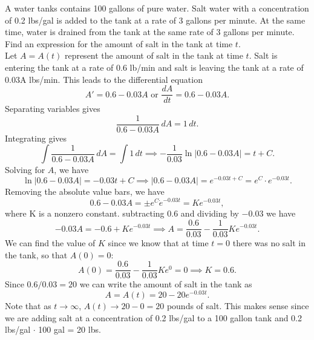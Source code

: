 \documentclass{ximera}
\begin{document}
\begin{example}[example 6]
A water tanks contains 100 gallons of pure water. Salt water with a concentration of 0.2 lbs/gal is added to the tank at a rate of 3 gallons per minute.
At the same time, water is drained from the tank at the same rate of 3 gallons per minute.
Find an expression for the amount of salt in the tank at time $t$.\\
Let $A = A(t)$ represent the amount of salt in the tank at time $t$. Salt is entering the tank at a rate of 0.6 lb/min and 
salt is leaving the tank at a rate of 0.03A lbs/min. This leads to the differential equation
\[
A' = 0.6 - 0.03A \text{  or  } \frac{dA}{dt} = 0.6 - 0.03A.
\]
Separating variables gives
\[
\frac{1}{0.6 -0.03A} \, dA = 1\, dt.
\]
Integrating gives
\[
\int \frac{1}{0.6 -0.03A} \, dA = \int 1 \, dt \implies -\frac{1}{0.03}\ln|0.6 - 0.03A|  = t + C.
\]
Solving for $A$, we have
\[
\ln|0.6 - 0.03A|  = -0.03t + C \implies |0.6-0.03A| = e^{-0.03t + C} = e^C \cdot e^{-0.03t}.
\]
Removing the absolute value bars, we have
\[
0.6 - 0.03A = \pm e^C \dot e^{-0.03t} = Ke^{-0.03t},
\]
where K is a nonzero constant.
subtracting $0.6$ and dividing by $-0.03$ we have 
\[
-0.03A = -0.6 + Ke^{-0.03t} \implies A = \frac{0.6}{0.03} - \frac{1}{0.03}Ke^{-0.03t}.
\]
We can find the value of $K$ since we know that at time $t = 0$ there was no salt in the tank, so that $A(0) = 0$:
\[
A(0) = \frac{0.6}{0.03} - \frac{1}{0.03}Ke^0 = 0 \implies  K = 0.6.
\]
Since $0.6/0.03 = 20$ we can write the amount of salt in the tank as
\[
A= A(t) = 20 - 20e^{-0.03t}.
\]
Note that as $t\to \infty$, $A(t) \to 20 - 0 = 20$ pounds of salt. 
This makes sense since we are adding salt at a concentration of 0.2 lbs/gal to a 100 gallon tank and 0.2 lbs/gal $\cdot$ 100 gal = 20 lbs.
\end{example}
\end{document}
